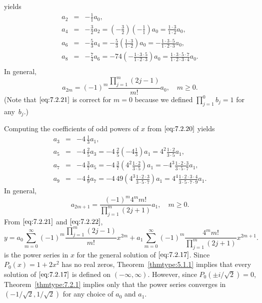 \documentclass{ximera}
\begin{document}
\begin{example}
\begin{explanation}
yields
\begin{eqnarray*}
a_2&=&-\frac{1}{1}a_0,\\
a_4&=&-\frac{3}{2}a_2=\left(-\frac{3}{2}\right)\left(-\frac{1}{1}\right)a_0
=\frac{1\cdot3}{1\cdot2}a_0,
\\ a_6&=&-\frac{5}{3}a_4=
-\frac{5}{3}\left(\frac{1\cdot3}{1\cdot2}\right)a_0
=-\frac{1\cdot3\cdot5}{1\cdot2\cdot3}a_0, \\
a_8&=&-\frac{7}{4}a_6=-{7}{4}
\left(-\frac{1\cdot3\cdot5}{1\cdot2\cdot3}\right)a_0=
\frac{1\cdot3\cdot5\cdot7}{1\cdot2\cdot3\cdot4}a_0.\\
\end{eqnarray*}
In general,
\begin{equation}\label{eq:7.2.21}
a_{2m}=(-1)^m\frac{\prod_{j=1}^m(2j-1)}{m!}a_0,\quad m\geq0.
\end{equation}
(Note that $\eqref{eq:7.2.21}$ is correct for $m=0$  because we
defined $\prod_{j=1}^0b_j=1$  for any~$b_j$.)

Computing the coefficients of odd powers of $x$ from $\eqref{eq:7.2.20}$
yields
\begin{eqnarray*}
a_3&=&-4\,\frac{1}{3}a_1, \\
a_5&=&-4\,\frac{2}{5}a_3=-4\,\frac{2}{5}\left(-4\frac{1}{3}\right)a_1
=4^2\frac{1\cdot2}{3\cdot5}a_1,
\\ a_7&=&-4\,\frac{3}{7}a_5=-4\,\frac{3}{7}\left(
4^2\frac{1\cdot2}{3\cdot5}\right)a_1=
-4^3\frac{1\cdot2\cdot3}{3\cdot5\cdot7}a_1,\\
a_9&=&-4\, \frac{4}{9}a_7=-4\, {4}{9}\left(
4^3\frac{1\cdot2\cdot3}{3\cdot5\cdot7}\right)a_1=
4^4\frac{1\cdot2\cdot3\cdot4}{3\cdot5\cdot7\cdot9}a_1.
\end{eqnarray*}
In general,
\begin{equation}\label{eq:7.2.22}
a_{2m+1}=\frac{(-1)^m4^m m!}{\prod_{j=1}^m(2j+1)}a_1,\quad m\geq0.
\end{equation}
From $\eqref{eq:7.2.21}$ and $\eqref{eq:7.2.22}$,
$$
y=a_0
 \sum^\infty_{m=0}(-1)^m \frac{\prod_{j=1}^m(2j-1)}{m!}x^{2m}
+a_1 \sum^\infty_{m=0}(-1)^m \frac{4^mm!}{\prod_{j=1}^m(2j+1)}
 x^{2m+1}.
$$
is the power series in $x$ for the general solution of $\eqref{eq:7.2.17}$.
Since $P_0(x)=1+2x^2$ has no real zeros, Theorem~\ref{thmtype:5.1.1} implies that every solution of $\eqref{eq:7.2.17}$ is defined on $(-\infty,\infty)$.
However, since $P_0(\pm i/\sqrt2)=0$, Theorem~\ref{thmtype:7.2.1} implies only that the power series converges in $(-1/\sqrt2,1/\sqrt2)$ for any
choice of $a_0$ and $a_1$.
\end{explanation}
\end{example}
\end{document}
